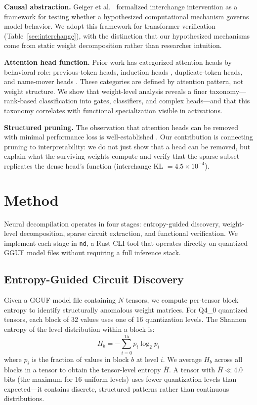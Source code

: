 \documentclass[11pt]{article}
\begin{document}
\textbf{Causal abstraction.} Geiger et al.\ \cite{geiger2023} formalized interchange intervention as a framework for testing whether a hypothesized computational mechanism governs model behavior. We adopt this framework for transformer verification (Table~\ref{sec:interchange}), with the distinction that our hypothesized mechanisms come from static weight decomposition rather than researcher intuition.

\textbf{Attention head function.} Prior work has categorized attention heads by behavioral role: previous-token heads, induction heads \cite{olsson2022}, duplicate-token heads, and name-mover heads \cite{wang2023}. These categories are defined by attention pattern, not weight structure. We show that weight-level analysis reveals a finer taxonomy---rank-based classification into gates, classifiers, and complex heads---and that this taxonomy correlates with functional specialization visible in activations.

\textbf{Structured pruning.} The observation that attention heads can be removed with minimal performance loss is well-established \cite{voita2019,michel2019}. Our contribution is connecting pruning to interpretability: we do not just show that a head can be removed, but explain what the surviving weights compute and verify that the sparse subset replicates the dense head's function (interchange KL $= 4.5 \times 10^{-4}$).

\section{Method}

Neural decompilation operates in four stages: entropy-guided discovery, weight-level decomposition, sparse circuit extraction, and functional verification. We implement each stage in \texttt{nd}, a Rust CLI tool that operates directly on quantized GGUF \cite{gguf} model files without requiring a full inference stack.

\subsection{Entropy-Guided Circuit Discovery}

Given a GGUF model file containing $N$ tensors, we compute per-tensor block entropy to identify structurally anomalous weight matrices. For Q4\_0 quantized tensors, each block of 32 values uses one of 16 quantization levels. The Shannon entropy of the level distribution within a block is:
\begin{equation}
  H_b = -\sum_{i=0}^{15} p_i \log_2 p_i
\end{equation}
where $p_i$ is the fraction of values in block $b$ at level $i$. We average $H_b$ across all blocks in a tensor to obtain the tensor-level entropy $\bar{H}$. A tensor with $\bar{H} \ll 4.0$ bits (the maximum for 16 uniform levels) uses fewer quantization levels than expected---it contains discrete, structured patterns rather than continuous distributions.
\end{document}
